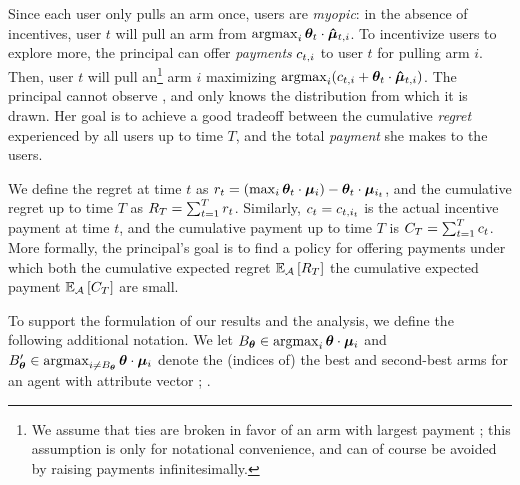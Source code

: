 Since each user only pulls an arm once, users are \emph{myopic}:
in the absence of incentives, user $t$ will pull an arm from
$\mathop{\mathrm{argmax}}_i \bm{\theta}_{t} \cdot \bm{\hat{\mu}}_{t,i}$.
To incentivize users to explore more, the principal can offer
\emph{payments} $c_{t,i}$ to user $t$ for pulling arm $i$.
Then, user $t$ will pull an\footnote{We assume that ties are broken in
  favor of an arm with largest payment ; this assumption is
  only for notational convenience, and can of course be avoided by
  raising payments infinitesimally.
  } arm $i$ maximizing
$\mathop{\mathrm{argmax}}_i (c_{t,i} + \bm{\theta}_{t} \cdot \bm{\hat{\mu}}_{t,i})$.
The principal cannot observe ,
and only knows the distribution \AgentDist from which it is drawn.
Her goal is to achieve a good tradeoff between the cumulative
\emph{regret} experienced by all users up to time $T$,
and the total \emph{payment} she makes to the users.

We define the regret at time $t$ as
$r_{t} = (\max_{i} \bm{\theta}_{t} \cdot \bm{\mu}_{i}) - \bm{\theta}_{t} \cdot \bm{\mu}_{i_{t}}$,
and the cumulative regret up to time $T$ as
$R_{T} = \sum_{t=1}^{T} r_{t}$.
Similarly, $c_{t} = c_{t,i_{t}}$ is the actual incentive
payment at time $t$,
and the cumulative payment up to time $T$ is
$C_{T} = \sum_{t=1}^{T} c_{t}$.
More formally, the principal's goal is to find a policy
\POLICY for offering payments under which both the cumulative expected
regret
$\Expect[\POLICY]{\TotalRegret{T}}$ the cumulative expected payment
$\Expect[\POLICY]{\TotalPay{T}}$ are small.

To support the formulation of our results and the analysis,
we define the following additional notation.
We let
$B_{\bm{\theta}} \in \mathop{\mathrm{argmax}}_i \bm{\theta} \cdot \bm{\mu}_{i}$
and
$ B'_{\bm{\theta}} \in \mathop{\mathrm{argmax}}_{i \neq B_{\bm{\theta}}} \bm{\theta} \cdot \bm{\mu}_{i}$
denote the (indices of) the best and second-best arms for an agent
with attribute vector \AgV;
.

